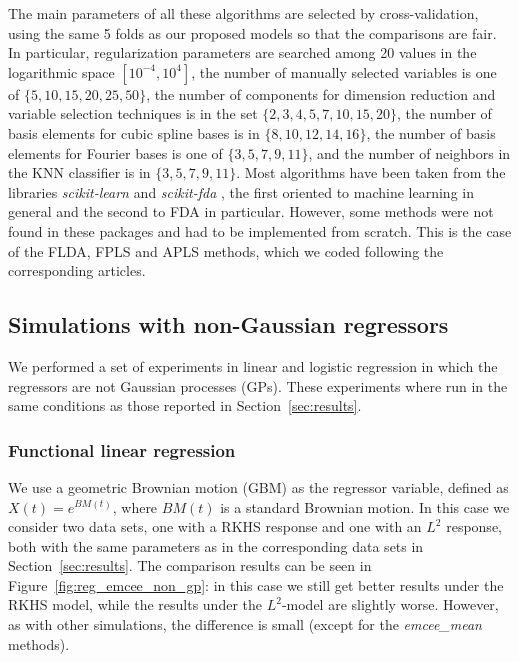 The main parameters of all these algorithms are selected by cross-validation, using the same 5 folds as our proposed models so that the comparisons are fair. In particular, regularization parameters are searched among 20 values in the logarithmic space \([10^{-4}, 10^4]\), the number of manually selected variables is one of \(\{5, 10, 15, 20, 25, 50\}\), the number of components for dimension reduction and variable selection techniques is in the set \(\{2, 3, 4, 5, 7, 10, 15, 20\}\), the number of basis elements for cubic spline bases is in \(\{8,10,12,14,16\}\), the number of basis elements for Fourier bases is one of \(\{3,5,7,9,11\}\), and the number of neighbors in the KNN classifier is in \(\{3,5,7,9,11\}\). Most algorithms have been taken from the libraries \textit{scikit-learn} \citep{pedregosa2011scikit} and \textit{scikit-fda} \citep{ramos2023scikit}, the first oriented to machine learning in general and the second to FDA in particular. However, some methods were not found in these packages and had to be implemented from scratch. This is the case of the FLDA, FPLS and APLS methods, which we coded following the corresponding articles.

\subsection{Simulations with non-Gaussian regressors}\label{app:non-gp}

We performed a set of experiments in linear and logistic regression in which the regressors are not Gaussian processes (GPs). These experiments where run in the same conditions as those reported in Section~\ref{sec:results}.

\subsubsection*{Functional linear regression}

We use a geometric Brownian motion (GBM) as the regressor variable, defined as \(X(t)=e^{BM(t)}\), where \(BM(t)\) is a standard Brownian motion. In this case we consider two data sets, one with a RKHS response and one with an \(L^2\) response, both with the same parameters as in the corresponding data sets in Section~\ref{sec:results}. The comparison results can be seen in Figure~\ref{fig:reg_emcee_non_gp}: in this case we still get better results under the RKHS model, while the results under the \(L^2\)-model are slightly worse. However, as with other simulations, the difference is small (except for the \textit{emcee\_mean} methods).

